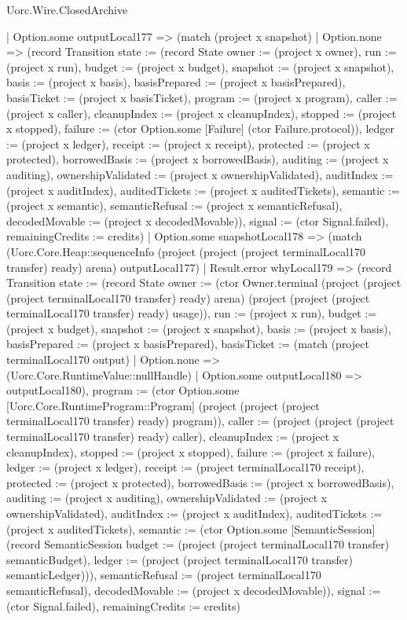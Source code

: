\begin{lexlean}{Uorc.Wire.ClosedArchive}
\begin{semanticmodule}
{            | Option.some outputLocal177 => (match (project x snapshot)
              | Option.none => (record Transition {state := (record State {owner := (project x owner), run := (project x run), budget := (project x budget), snapshot := (project x snapshot), basis := (project x basis), basisPrepared := (project x basisPrepared), basisTicket := (project x basisTicket), program := (project x program), caller := (project x caller), cleanupIndex := (project x cleanupIndex), stopped := (project x stopped), failure := (ctor Option.some [Failure] (ctor Failure.protocol)), ledger := (project x ledger), receipt := (project x receipt), protected := (project x protected), borrowedBasis := (project x borrowedBasis), auditing := (project x auditing), ownershipValidated := (project x ownershipValidated), auditIndex := (project x auditIndex), auditedTickets := (project x auditedTickets), semantic := (project x semantic), semanticRefusal := (project x semanticRefusal), decodedMovable := (project x decodedMovable)}), signal := (ctor Signal.failed), remainingCredits := credits})
              | Option.some snapshotLocal178 => (match (Uorc.Core.Heap::sequenceInfo (project (project (project terminalLocal170 transfer) ready) arena) outputLocal177)
                | Result.error whyLocal179 => (record Transition {state := (record State {owner := (ctor Owner.terminal (project (project (project terminalLocal170 transfer) ready) arena) (project (project (project terminalLocal170 transfer) ready) usage)), run := (project x run), budget := (project x budget), snapshot := (project x snapshot), basis := (project x basis), basisPrepared := (project x basisPrepared), basisTicket := (match (project terminalLocal170 output)
                  | Option.none => (Uorc.Core.RuntimeValue::nullHandle)
                  | Option.some outputLocal180 => outputLocal180), program := (ctor Option.some [Uorc.Core.RuntimeProgram::Program] (project (project (project terminalLocal170 transfer) ready) program)), caller := (project (project (project terminalLocal170 transfer) ready) caller), cleanupIndex := (project x cleanupIndex), stopped := (project x stopped), failure := (project x failure), ledger := (project x ledger), receipt := (project terminalLocal170 receipt), protected := (project x protected), borrowedBasis := (project x borrowedBasis), auditing := (project x auditing), ownershipValidated := (project x ownershipValidated), auditIndex := (project x auditIndex), auditedTickets := (project x auditedTickets), semantic := (ctor Option.some [SemanticSession] (record SemanticSession {budget := (project (project terminalLocal170 transfer) semanticBudget), ledger := (project (project terminalLocal170 transfer) semanticLedger)})), semanticRefusal := (project terminalLocal170 semanticRefusal), decodedMovable := (project x decodedMovable)}), signal := (ctor Signal.failed), remainingCredits := credits})
}
\end{semanticmodule}
\end{lexlean}
